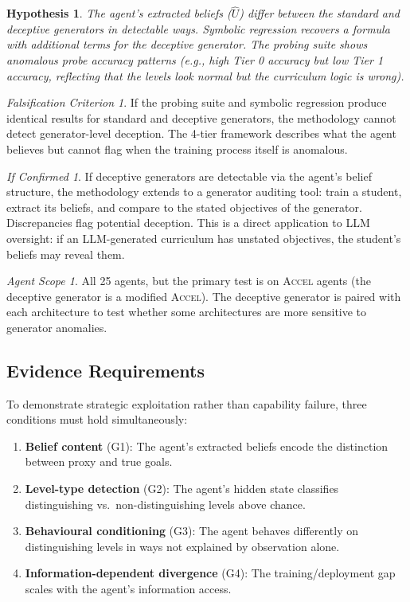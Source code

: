 \documentclass[11pt,a4paper]{article}
\newtheorem{hypothesis}{Hypothesis}[subsection]
\theoremstyle{remark}
\newtheorem*{falsification}{Falsification Criterion}
\newtheorem*{implication}{If Confirmed}
\newtheorem*{agentscope}{Agent Scope}
\newcommand{\accel}{\textsc{Accel}}
\newcommand{\Uhat}{\hat{U}}
\begin{document}
\begin{hypothesis}
The agent's extracted beliefs ($\Uhat$) differ between the standard and deceptive generators in detectable ways. Symbolic regression recovers a formula with additional terms for the deceptive generator. The probing suite shows anomalous probe accuracy patterns (e.g., high Tier 0 accuracy but low Tier 1 accuracy, reflecting that the levels look normal but the curriculum logic is wrong).
\end{hypothesis}

\begin{falsification}
If the probing suite and symbolic regression produce identical results for standard and deceptive generators, the methodology cannot detect generator-level deception. The 4-tier framework describes what the agent believes but cannot flag when the training process itself is anomalous.
\end{falsification}

\begin{implication}
If deceptive generators are detectable via the agent's belief structure, the methodology extends to a generator auditing tool: train a student, extract its beliefs, and compare to the stated objectives of the generator. Discrepancies flag potential deception. This is a direct application to LLM oversight: if an LLM-generated curriculum has unstated objectives, the student's beliefs may reveal them.
\end{implication}

\begin{agentscope}
All 25 agents, but the primary test is on \accel{} agents (the deceptive generator is a modified \accel{}). The deceptive generator is paired with each architecture to test whether some architectures are more sensitive to generator anomalies.
\end{agentscope}

\subsection{Evidence Requirements}

To demonstrate strategic exploitation rather than capability failure, three conditions must hold simultaneously:
\begin{enumerate}[nosep]
    \item \textbf{Belief content} (G1): The agent's extracted beliefs encode the distinction between proxy and true goals.
    \item \textbf{Level-type detection} (G2): The agent's hidden state classifies distinguishing vs.\ non-distinguishing levels above chance.
    \item \textbf{Behavioural conditioning} (G3): The agent behaves differently on distinguishing levels in ways not explained by observation alone.
    \item \textbf{Information-dependent divergence} (G4): The training/deployment gap scales with the agent's information access.
\end{enumerate}
\end{document}
